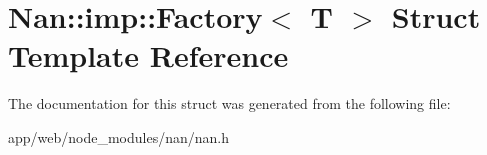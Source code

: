 \hypertarget{struct_nan_1_1imp_1_1_factory}{}\section{Nan\+:\+:imp\+:\+:Factory$<$ T $>$ Struct Template Reference}
\label{struct_nan_1_1imp_1_1_factory}


The documentation for this struct was generated from the following file\+:\begin{DoxyCompactItemize}
\item 
app/web/node\+\_\+modules/nan/nan.\+h\end{DoxyCompactItemize}
